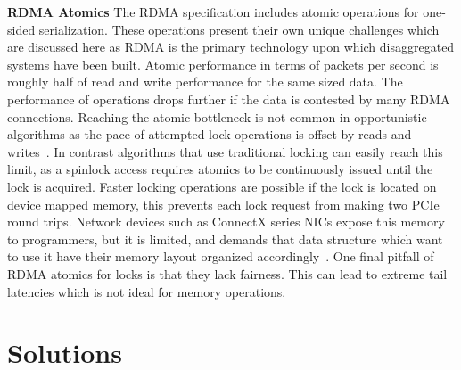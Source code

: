 
\textbf{RDMA Atomics}
The RDMA specification includes atomic operations for one-sided serialization.
These operations present their own unique challenges which are discussed here as
RDMA is the primary technology upon which disaggregated systems have been built.
Atomic performance in terms of packets per second is roughly half of read and
write performance for the same sized data. The performance of operations drops
further if the data is contested by many RDMA connections. Reaching the atomic
bottleneck is not common in opportunistic algorithms as the pace of attempted
lock operations is offset by reads and writes~\cite{clover}. In contrast
algorithms that use traditional locking can easily reach this limit, as a
spinlock access requires atomics to be continuously issued until the lock is
acquired. Faster locking operations are possible if the lock is located on
device mapped memory, this prevents each lock request from making two PCIe round
trips. Network devices such as ConnectX series NICs expose this memory to
programmers, but it is limited, and demands that data structure which want to
use it have their memory layout organized accordingly~\cite{sherman}. One final
pitfall of RDMA atomics for locks is that they lack fairness. This can lead to
extreme tail latencies which is not ideal for memory operations.

\section{Solutions}
\label{sec:solutions}


